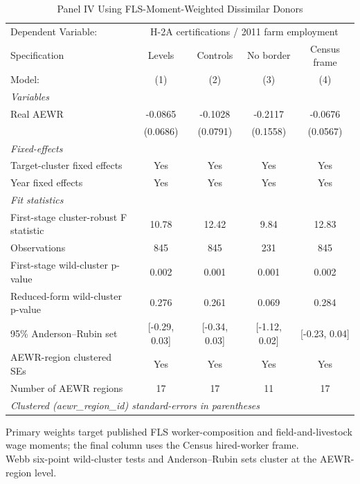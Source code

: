 
\begin{table}[htbp]
   \caption{\label{tab:iv_dissimilarity_panel} Panel IV Using FLS-Moment-Weighted Dissimilar Donors}
   \centering
   \scriptsize
   \begin{tabular}{lcccc}
      \tabularnewline \midrule \midrule
      Dependent Variable: & \multicolumn{4}{c}{H-2A certifications / 2011 farm employment}\\
      Specification                          & Levels        & Controls      & No border     & Census frame \\   
      Model:                                 & (1)           & (2)           & (3)           & (4)\\  
      \midrule
      \emph{Variables}\\
      Real AEWR                              & -0.0865       & -0.1028       & -0.2117       & -0.0676\\   
                                             & (0.0686)      & (0.0791)      & (0.1558)      & (0.0567)\\   
      \midrule
      \emph{Fixed-effects}\\
      Target-cluster fixed effects           & Yes           & Yes           & Yes           & Yes\\  
      Year fixed effects                     & Yes           & Yes           & Yes           & Yes\\  
      \midrule
      \emph{Fit statistics}\\
      First-stage cluster-robust F statistic & 10.78         & 12.42         & 9.84          & 12.83\\  
      Observations                           & 845           & 845           & 231           & 845\\  
      First-stage wild-cluster p-value       & 0.002         & 0.001         & 0.001         & 0.002\\  
      Reduced-form wild-cluster p-value      & 0.276         & 0.261         & 0.069         & 0.284\\  
      95\% Anderson--Rubin set               & [-0.29, 0.03] & [-0.34, 0.03] & [-1.12, 0.02] & [-0.23, 0.04]\\  
      AEWR-region clustered SEs              & Yes           & Yes           & Yes           & Yes\\  
      Number of AEWR regions                 & 17            & 17            & 11            & 17\\  
      \midrule \midrule
      \multicolumn{5}{l}{\emph{Clustered (aewr\_region\_id) standard-errors in parentheses}}\\
   \end{tabular}
   
   \par \raggedright 
   Primary weights target published FLS worker-composition and field-and-livestock wage moments; the final column uses the Census hired-worker frame.\\
   Webb six-point wild-cluster tests and Anderson--Rubin sets cluster at the AEWR-region level.
\end{table}


